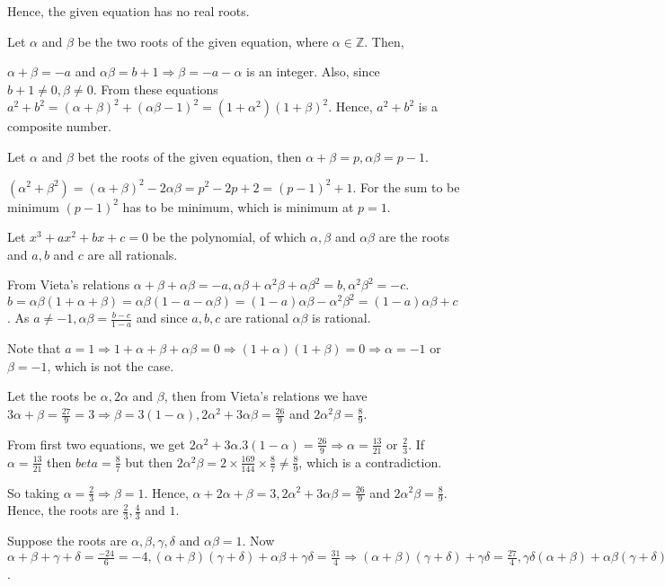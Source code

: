  Hence, the given equation has no real roots.
\item Let $\alpha$ and $\beta$ be the two roots of the given equation, where $\alpha\in\mathbb{Z}$. Then,

  $\alpha + \beta = -a$ and $\alpha\beta = b + 1\Rightarrow \beta = -a -\alpha$ is an integer. Also, since
  $b + 1\neq 0, \beta\neq 0$. From these equations $a^2 + b^2 = (\alpha + \beta)^2 + (\alpha\beta - 1)^2 =
  (1 + \alpha^2)(1 + \beta)^2$. Hence, $a^2 + b^2$ is a composite number.
\item Let $\alpha$ and $\beta$ bet the roots of the given equation, then $\alpha + \beta = p, \alpha\beta =
  p - 1$.

  $(\alpha^2 + \beta^2) = (\alpha + \beta)^2 - 2\alpha\beta = p^2 - 2p + 2 = (p - 1)^2 + 1$. For the sum to
  be minimum $(p - 1)^2$ has to be minimum, which is minimum at $p = 1$.
\item Let $x^3 + ax^2 + bx + c = 0$ be the polynomial, of which $\alpha,\beta$ and $\alpha\beta$ are the
  roots and $a, b$ and $c$ are all rationals.

  From Vieta's relations $\alpha + \beta + \alpha\beta = -a, \alpha\beta + \alpha^2\beta + \alpha\beta^2 =
  b, \alpha^2\beta^2 = -c.$ $b = \alpha\beta(1 + \alpha + \beta) = \alpha\beta(1 - a - \alpha\beta) = (1 -
  a)\alpha\beta - \alpha^2\beta^2 = (1 - a)\alpha\beta + c$. As $a\neq -1, \alpha\beta = \frac{b - c}{1 -
    a}$ and since $a, b, c$ are rational $\alpha\beta$ is rational.

  Note that $a = 1 \Rightarrow 1 + \alpha + \beta + \alpha\beta = 0 \Rightarrow (1 + \alpha)(1 + \beta) = 0
  \Rightarrow \alpha = -1$ or $\beta = -1$, which is not the case.
\item Let the roots be $\alpha, 2\alpha$ and $\beta$, then from Vieta's relations we have $3\alpha + \beta =
  \frac{27}{9} = 3 \Rightarrow \beta = 3(1 - \alpha), 2\alpha^2 + 3\alpha\beta = \frac{26}{9}$ and
  $2\alpha^2\beta = \frac{8}{9}$.

  From first two equations, we get $2\alpha^2 + 3\alpha.3(1 - \alpha) = \frac{26}{9} \Rightarrow \alpha =
  \frac{13}{21}$ or $\frac{2}{3}$. If $\alpha = \frac{13}{21}$ then $beta = \frac{8}{7}$ but then
  $2\alpha^2\beta = 2\times\frac{169}{144}\times\frac{8}{7}\neq \frac{8}{9}$, which is a contradiction.

  So taking $\alpha = \frac{2}{3}\Rightarrow \beta = 1$. Hence, $\alpha + 2\alpha + \beta =3, 2\alpha^2 +
  3\alpha\beta = \frac{26}{9}$ and $2\alpha^2\beta = \frac{8}{9}$. Hence, the roots are $\frac{2}{3},
  \frac{4}{3}$ and $1$.
\item Suppose the roots are $\alpha, \beta, \gamma, \delta$ and $\alpha\beta = 1$. Now $\alpha + \beta +
  \gamma + \delta = \frac{-24}{6} = -4, (\alpha + \beta)(\gamma + \delta) + \alpha\beta + \gamma\delta =
  \frac{31}{4}\Rightarrow (\alpha + \beta)(\gamma + \delta) + \gamma\delta = \frac{27}{4},
  \gamma\delta(\alpha + \beta) + \alpha\beta(\gamma + \delta) = \frac{-3}{2} \Rightarrow \gamma\delta(\alpha
  + \beta) + \gamma + \delta = \frac{-3}{2}, \alpha\beta\gamma\delta = -2\Rightarrow \gamma\delta = -2$.

